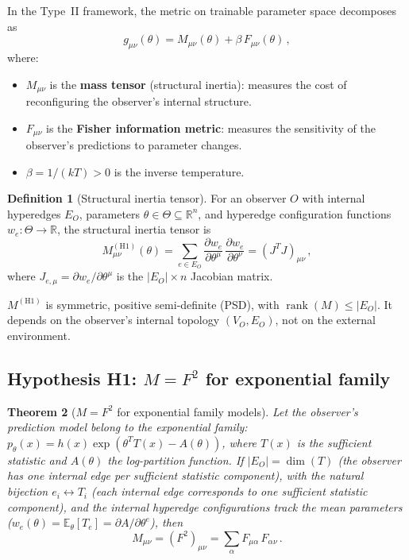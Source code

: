 \documentclass[11pt]{article}
\newtheorem{theorem}{Theorem}[section]
\theoremstyle{definition}
\newtheorem{definition}[theorem]{Definition}
\theoremstyle{remark}
\begin{document}
In the Type~II framework, the metric on trainable parameter space
decomposes as
\begin{equation}
\label{eq:metric-decomposition}
g_{\mu\nu}(\theta) = M_{\mu\nu}(\theta) + \beta\, F_{\mu\nu}(\theta)\,,
\end{equation}
where:
\begin{itemize}
\item $M_{\mu\nu}$ is the \textbf{mass tensor} (structural inertia):
  measures the cost of reconfiguring the observer's internal structure.
\item $F_{\mu\nu}$ is the \textbf{Fisher information metric}: measures
  the sensitivity of the observer's predictions to parameter changes.
\item $\beta = 1/(kT) > 0$ is the inverse temperature.
\end{itemize}

\begin{definition}[Structural inertia tensor]
\label{def:H1}
For an observer $O$ with internal hyperedges $E_O$, parameters
$\theta \in \Theta \subseteq \mathbb{R}^n$, and hyperedge configuration
functions $w_e : \Theta \to \mathbb{R}$, the structural inertia
tensor is
\begin{equation}
\label{eq:H1}
M^{(\mathrm{H1})}_{\mu\nu}(\theta) = \sum_{e \in E_O}
\frac{\partial w_e}{\partial \theta^\mu}\,
\frac{\partial w_e}{\partial \theta^\nu}
= (J^T J)_{\mu\nu}\,,
\end{equation}
where $J_{e,\mu} = \partial w_e / \partial \theta^\mu$ is the
$|E_O| \times n$ Jacobian matrix.
\end{definition}

$M^{(\mathrm{H1})}$ is symmetric, positive semi-definite (PSD), with
$\operatorname{rank}(M) \leq |E_O|$.
It depends on the observer's internal topology $(V_O, E_O)$, not on the
external environment.

\subsection{Hypothesis H1: $M = F^2$ for exponential family}
\label{sec:M-equals-F-squared}

\begin{theorem}[$M = F^2$ for exponential family models]
\label{thm:M-F-squared}
Let the observer's prediction model belong to the exponential family:
$p_\theta(x) = h(x) \exp(\theta^T T(x) - A(\theta))$, where $T(x)$ is
the sufficient statistic and $A(\theta)$ the log-partition function.
If $|E_O| = \dim(T)$ (the observer has one internal edge per sufficient
statistic component), with the natural bijection $e_i \leftrightarrow T_i$ (each internal
edge corresponds to one sufficient statistic component), and
the internal hyperedge configurations track the \emph{mean parameters}
($w_e(\theta) = \mathbb{E}_\theta[T_e] = \partial A / \partial\theta^e$),
then
\begin{equation}
\label{eq:M-F-squared}
M_{\mu\nu} = (F^2)_{\mu\nu} =
\sum_{\alpha} F_{\mu\alpha}\, F_{\alpha\nu}\,.
\end{equation}
\end{theorem}
\end{document}
